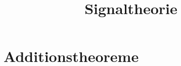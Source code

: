 \documentclass[german]{latex4ei/latex4ei_sheet}
\title{Signaltheorie}
\begin{document}
\maketitle

	\section{Additionstheoreme}
\end{document}
